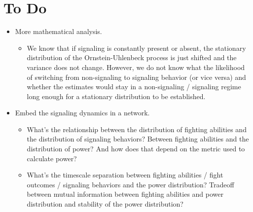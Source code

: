 \documentclass{article}
\begin{document}
\section{To Do }

\begin{itemize}
\item More mathematical analysis.
\begin{itemize}
\item We know that if signaling is constantly present or absent, the stationary distribution of the Ornstein-Uhlenbeck process is just shifted and the variance does not change.  However, we do not know what the likelihood of switching from non-signaling to signaling behavior (or vice versa) and whether the estimates would stay in a non-signaling / signaling regime long enough for a stationary distribution to be established.
\end{itemize}
\item Embed the signaling dynamics in a network.  
\begin{itemize}
\item What's the relationship between the distribution of fighting abilities and the distribution of signaling behaviors?  Between fighting abilities and the distribution of power?  And how does that depend on the metric used to calculate power?
\item What's the timescale separation between fighting abilities / fight outcomes / signaling behaviors and the power distribution?  Tradeoff between mutual information between fighting abilities and power distribution and stability of the power distribution?
\end{itemize}
\end{itemize}



\nocite{*}


\end{document}
